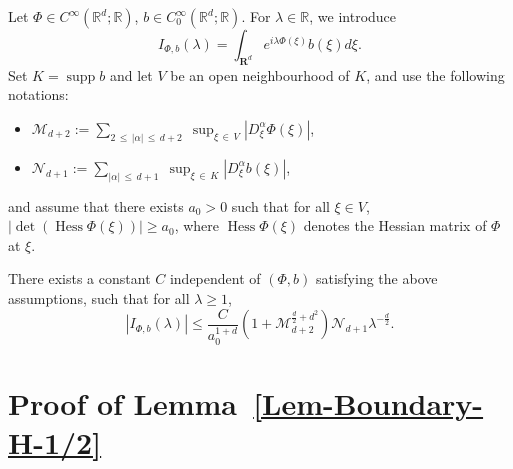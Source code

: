 \documentclass[AHL,Unicode,longabstracts]{cedram}
\newcommand*\R{\mathbb{R}}
\newcommand{\bfR}{\mathbf{R}}
\newcommand{\clM}{\mathcal{M}}
\newcommand{\clN}{\mathcal{N}}
\newcommand*\ds{\displaystyle}
\renewcommand{\leq}{\leqslant}
\renewcommand{\geq}{\geqslant}
\DeclareMathOperator{\Hess}{Hess}
\DeclareMathOperator{\supp}{supp}
\renewcommand{\det}{\operatorname{det}}
\begin{document}
\begin{theo}\label{Thm-Stationary-Phase}
Let $\Phi \in C^{\infty}(\R^d; \R)$, $b \in C_0^{\infty}(\R^d; \R)$. For $\lambda \in \R$, we introduce
\[
I_{\Phi,b}(\lambda)=\int_{\bfR^d} e^{i \lambda \Phi(\xi)} b(\xi) d \xi.
\]
Set $K=\supp b$ and let $V$ be an open neighbourhood of $K$, and use the following notations:
\begin{itemize}
\item $\ds\clM_{d+2}:=\sum_{2\, \leq\,|\alpha| \,\leq\,d+2}\; \sup _{\xi\,\in\,V}\left|D_{\xi}^\alpha \Phi(\xi)\right|$,
\item $\ds \clN_{d+1}:=\sum_{|\alpha|\,\leq \,d+1}\; \sup _{\xi\,\in\,K}\left|D_{\xi}^\alpha b(\xi)\right|$,
\end{itemize}
and assume that there exists $a_0 >0$ such that for all $\xi \in V$, $|\det (\Hess \Phi(\xi)) | \geq a_0$, where $ \Hess \Phi(\xi) $ denotes the Hessian matrix of $\Phi$ at $\xi$.

There exists a constant $C$ independent of $(\Phi, b)$ satisfying the above assumptions, such that for all $\lambda \geq 1$,
\[
|I_{\Phi,b} (\lambda)|
\leq
\frac{C}{a_0^{1+d}}\left(1+\clM_{d+2}^{\frac{d}{2}+d^2}\right) \clN_{d+1} \lambda^{-\frac{d}{2}}.
\]
\end{theo}

\section{Proof of Lemma~\ref{Lem-Boundary-H-1/2}}\label{Appendix-B}
\end{document}
